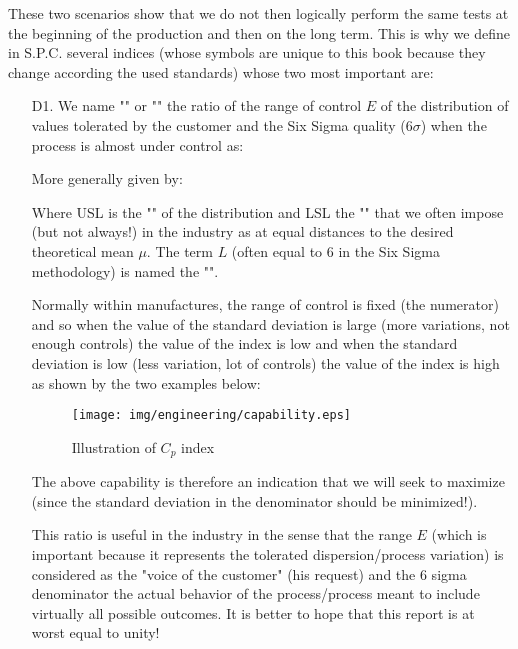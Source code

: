 These two scenarios show that we do not then logically perform the same  tests at the beginning of the production and then on the long term. This is why we define in S.P.C. several indices (whose symbols are unique to this book because they change according the used standards) whose two most important are:
	\begin{enumerate}
		\item[D1.] We name "" or "" the ratio of the range of control $E$  of the distribution of values tolerated by the customer and the Six Sigma quality ($6 \sigma$) when the process is almost under control as:
		
		More generally given by:
		
		Where USL is the "" of the distribution and LSL the "" that we often impose (but not always!) in the industry as at equal distances to the desired theoretical mean $\mu$. The term $L$ (often equal to $6$ in the Six Sigma methodology) is named the "".
		
		Normally within manufactures, the range of control is fixed (the numerator) and so when the value of the standard deviation is large (more variations, not enough controls) the value of the index is low and when the standard deviation is low (less variation, lot of controls) the value of the index is high as shown by the two examples below:
		
		\begin{figure}[H]
		\centering
		\texttt{[image: img/engineering/capability.eps]}
		\caption{Illustration of $C_p$ index}
		\end{figure}
		
		The above capability is therefore an indication that we will seek to maximize (since the standard deviation in the denominator should be minimized!).
		
		This ratio is useful in the industry in the sense that the range $E$ (which is important because it represents the tolerated dispersion/process variation\label{range six sigma}) is considered as the "voice of the customer" (his request) and the $6$ sigma denominator the actual behavior of the process/process meant to include virtually all possible outcomes. It is better to hope that this report is at worst equal to unity!
		

\end{enumerate}
